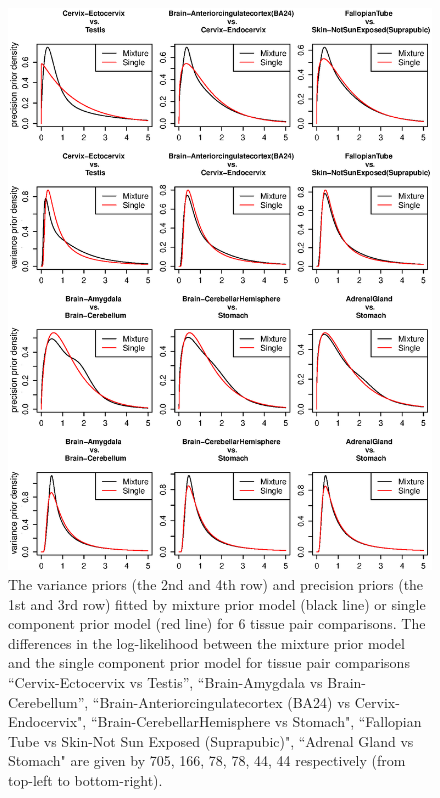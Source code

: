\documentclass{bioinfo}
\begin{document}
\begin{figure}[!hbp]
\includegraphics[width=\linewidth]{tissuepairs.eps}
\caption{The variance priors (the 2nd and 4th row) and precision priors (the 1st and 3rd row) fitted by mixture prior model (black line) or single component prior model (red line) for 6 tissue pair comparisons. The differences in the log-likelihood between the mixture prior model and the single component prior model for tissue pair comparisons ``Cervix-Ectocervix vs Testis'', ``Brain-Amygdala vs Brain-Cerebellum'', ``Brain-Anteriorcingulatecortex (BA24) vs Cervix-Endocervix", ``Brain-CerebellarHemisphere vs Stomach", ``Fallopian Tube vs Skin-Not Sun Exposed (Suprapubic)", ``Adrenal Gland vs Stomach" are given by 705, 166, 78, 78, 44, 44 respectively (from top-left to bottom-right).}
\label{fg:tissuepairs}
\end{figure}
\end{document}
